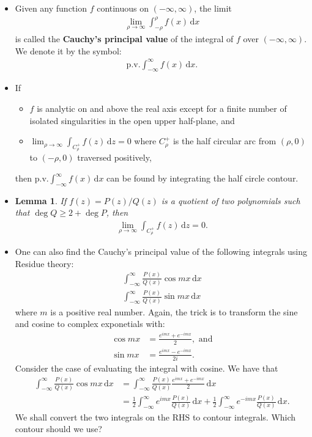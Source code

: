 \documentclass[10pt]{article}
\newtheorem{lemma}{Lemma}[section]
\newcommand{\dee}{\mathrm{d}}
\newcommand{\ra}{\rightarrow}
\newcommand{\pv}{\mathrm{p.v.}}
\begin{document}
\begin{itemize}
    \item Given any function $f$ continuous on $(-\infty, \infty)$, the limit
    \begin{align*}
      \lim_{\rho \ra \infty} \int_{-\rho}^\rho f(x)\, \dee x
    \end{align*}
    is called the {\bf Cauchy's principal value} of the integral of $f$ over $(-\infty, \infty)$. We denote it by the symbol:
    \begin{align*}
      \pv \int_{-\infty}^\infty f(x)\, \dee x.
    \end{align*}

    \item If 
    \begin{itemize}
      \item $f$ is analytic on and above the real axis except for a finite number of isolated singularities in the open upper half-plane, and
      \item $\lim_{\rho\ra \infty} \int_{C^+_\rho} f(z)\, \dee z = 0$ where $C^+_\rho$ is the half circular arc from $(\rho, 0)$ to $(-\rho, 0)$ traversed positively,
    \end{itemize}
    then $\pv \int_{-\infty}^\infty f(x)\, \dee x$ can be found by integrating the half circle contour.

    \item \begin{lemma}
      If $f(z) = P(z)/Q(z)$ is a quotient of two polynomials such that $\deg Q \geq 2 + \deg P$, then
      \begin{align*}
        \lim_{\rho \ra \infty} \int_{C^+_\rho} f(z)\,\dee z = 0.
      \end{align*}
    \end{lemma}

    \item One can also find the Cauchy's principal value of the following integrals using Residue theory:
    \begin{align*}
      \int_{-\infty}^\infty \frac{P(x)}{Q(x)} \cos mx\, \dee x\\
      \int_{-\infty}^\infty \frac{P(x)}{Q(x)} \sin mx\, \dee x
    \end{align*}
    where $m$ is a positive real number. Again, the trick is to transform the sine and cosine to complex exponetials with:
    \begin{align*}
      \cos mx &= \frac{e^{imx} + e^{-imx}}{2},\mbox{ and}\\
      \sin mx &= \frac{e^{imx} - e^{-imx}}{2i}.
    \end{align*}
    Consider the case of evaluating the integral with cosine. We have that
    \begin{align*}
      \int_{-\infty}^\infty \frac{P(x)}{Q(x)} \cos mx\, \dee x
      &= \int_{-\infty}^\infty \frac{P(x)}{Q(x)} \frac{e^{imx} + e^{-imx}}{2}\, \dee x\\
      &= \frac{1}{2} \int_{-\infty}^\infty e^{imx} \frac{P(x)}{Q(x)} \, \dee x + \frac{1}{2} \int_{-\infty}^\infty e^{-imx} \frac{P(x)}{Q(x)} \, \dee x.
    \end{align*}
    We shall convert the two integrals on the RHS to contour integrals. Which contour should we use?


\end{itemize}
\end{document}

